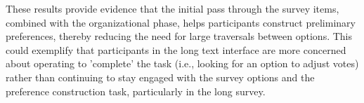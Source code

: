 These results provide evidence that the initial pass through the survey items, combined with the organizational phase, helps participants construct preliminary preferences, thereby reducing the need for large traversals between options. This could exemplify that participants in the long text interface are more concerned about operating to 'complete' the task (i.e., looking for an option to adjust votes) rather than continuing to stay engaged with the survey options and the preference construction task, particularly in the long survey.




